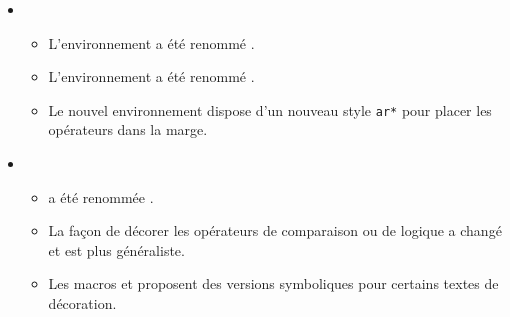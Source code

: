 \begin{itemize}[itemsep=.5em]
    \item {}
    \begin{itemize}[itemsep=.5em]
        \item L'environnement  a été renommé .

        \item L'environnement  a été renommé .

        \item Le nouvel environnement  dispose d'un nouveau style \verb#ar*# pour placer les opérateurs dans la marge.
    \end{itemize}


    \item {}
    \begin{itemize}[itemsep=.5em]
        \item {} a été renommée .

        \item La façon de décorer les opérateurs de comparaison ou de logique a changé et est plus généraliste.

        \item Les macros  et  proposent des versions symboliques pour certains textes de décoration.
    \end{itemize}
\end{itemize}


\separation
